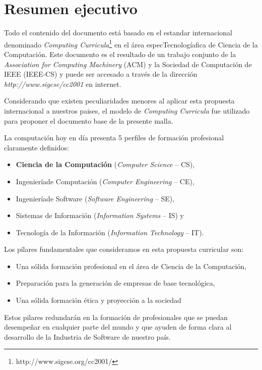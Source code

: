  \chapter*{Resumen ejecutivo}
\AbstractIntro

Todo el contenido del documento está basado en el estandar internacional denominado \textit{Computing Curricula}\footnote{http://www.sigcse.org/cc2001/} en el área especTecnologíafica de Ciencia de la Computación. Este documento es el resultado de un trabajo conjunto de la \textit{Association for Computing Machinery} (ACM) y la Sociedad de Computación de IEEE (IEEE-CS) y puede ser accesado a través de la dirección \textit{http://www.sigcse/cc2001} en internet.

Considerando que existen peculiaridades menores al aplicar esta propuesta internacional a nuestros paises, el modelo de \textit{Computing Curricula} fue utilizado para proponer el documento base de la presente malla. 

\noindent La computación hoy en día presenta 5 perfiles de formación profesional claramente definidos: 
\begin{itemize}
\item \textbf{Ciencia de la Computación} (\textit{Computer Science} -- CS),
\item Ingenieríade Computación (\textit{Computer Engineering} -- CE),
\item Ingenieríade Software (\textit{Software Engineering} -- SE),
\item Sistemas de Información (\textit{Information Systems} -- IS) y 
\item Tecnología de la Información (\textit{Information Technology} -- IT).
\end{itemize}

Los pilares fundamentales que consideramos en esta propuesta curricular son:
\begin{itemize}
\item Una sólida formación profesional en el área de Ciencia de la Computación,
\item Preparación para la generación de empresas de base tecnológica,
\item Una sólida formación ética y proyección a la sociedad
\end{itemize}

Estos pilares redundarán en la formación de profesionales que se puedan desempeñar en cualquier parte del mundo y que ayuden de forma clara al desarrollo de la Industria de Software de nuestro país. 

